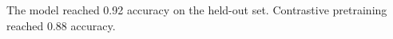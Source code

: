 The model reached 0.92 accuracy on the held-out set.
Contrastive pretraining reached 0.88 accuracy.
